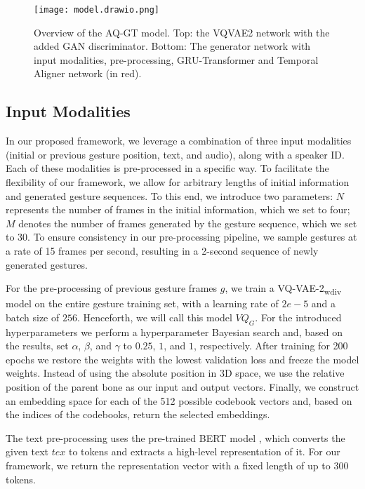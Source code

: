 \documentclass[sigconf]{acmart}
\begin{document}
\begin{figure*}[bth]
  \centering
  \texttt{[image: model.drawio.png]}
  \caption{Overview of the AQ-GT model. Top: the VQVAE2 network with the added GAN discriminator. Bottom: The generator network with input modalities, pre-processing, GRU-Transformer and Temporal Aligner network (in red).}
  \label{fig:model_overview}
\end{figure*}


\subsection{Input Modalities} \label{modalities}
In our proposed framework, we leverage a combination of three input modalities (initial or previous gesture position, text, and audio), along with a speaker ID. Each of these modalities is pre-processed in a specific way. To facilitate the flexibility of our framework, we allow for arbitrary lengths of initial information and generated gesture sequences. To this end, we introduce two parameters: $N$ represents the number of frames in the initial information, which we set to four; $M$ denotes the number of frames generated by the gesture sequence, which we set to 30. To ensure consistency in our pre-processing pipeline, we sample gestures at a rate of 15 frames per second, resulting in a 2-second sequence of newly generated gestures.

For the pre-processing of previous gesture frames $g$, we train a VQ-VAE-2\textsubscript{wdiv} model on the entire gesture training set, with a learning rate of $2e-5$ and a batch size of $256$. Henceforth, we will call this model $VQ_G$. For the introduced hyperparameters we perform a hyperparameter Bayesian search and, based on the results, set $\alpha$, $\beta$, and $\gamma$ to $0.25$, $1$, and $1$, respectively. After training for 200 epochs we restore the weights with the lowest validation loss and freeze the model weights. Instead of using the absolute position in 3D space, we use the relative position of the parent bone as our input and output vectors. Finally, we construct an embedding space for each of the 512 possible codebook vectors and, based on the indices of the codebooks, return the selected embeddings.

The text pre-processing uses the pre-trained BERT model \cite{devlinBERTPretrainingDeep2019}, which converts the given text $tex$ to tokens and extracts a high-level representation of it. For our framework, we return the representation vector with a fixed length of up to 300 tokens.
\end{document}
